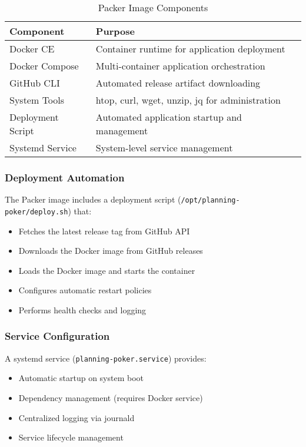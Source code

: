 \documentclass[11pt,a4paper]{article}
\begin{document}
\begin{table}[H]
\centering
\begin{tabular}{@{}ll@{}}
\toprule
\textbf{Component} & \textbf{Purpose} \\
\midrule
Docker CE & Container runtime for application deployment \\
Docker Compose & Multi-container application orchestration \\
GitHub CLI & Automated release artifact downloading \\
System Tools & htop, curl, wget, unzip, jq for administration \\
Deployment Script & Automated application startup and management \\
Systemd Service & System-level service management \\
\bottomrule
\end{tabular}
\caption{Packer Image Components}
\label{tab:packer-components}
\end{table}

\subsubsection{Deployment Automation}

The Packer image includes a deployment script (\texttt{/opt/planning-poker/deploy.sh}) that:

\begin{itemize}
    \item Fetches the latest release tag from GitHub API
    \item Downloads the Docker image from GitHub releases
    \item Loads the Docker image and starts the container
    \item Configures automatic restart policies
    \item Performs health checks and logging
\end{itemize}

\subsubsection{Service Configuration}

A systemd service (\texttt{planning-poker.service}) provides:

\begin{itemize}
    \item Automatic startup on system boot
    \item Dependency management (requires Docker service)
    \item Centralized logging via journald
    \item Service lifecycle management
\end{itemize}
\end{document}
